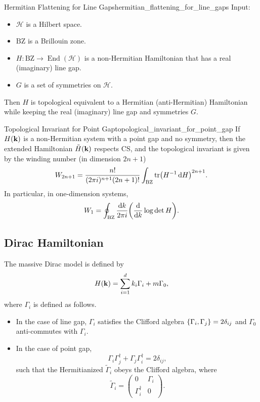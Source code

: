 \documentclass{article}
\begin{document}
\begin{theorem}{Hermitian Flattening for Line Gaps}{hermitian_flattening_for_line_gaps}
    Input:
    \begin{itemize}
        \item $\mathcal{H}$ is a Hilbert space.
        \item $\mathrm{BZ}$ is a Brillouin zone.
        \item $H: \mathrm{BZ} \rightarrow \operatorname{End}(\mathcal{H})$ is a non-Hermitian Hamiltonian that has a real (imaginary) line gap.
        \item $G$ is a set of symmetries on $\mathcal{H}$.
    \end{itemize}
    Then $H$ is topological equivalent to a Hermitian (anti-Hermitian) Hamiltonian while keeping the real (imaginary) line gap and symmetries $G$.
\end{theorem}

\begin{example}{Topological Invariant for Point Gap}{topological_invariant_for_point_gap}
    If $H(\vb{k})$ is a non-Hermitian system with a point gap and no symmetry, then the extended Hamiltonian $\tilde{H}(\vb{k})$ respects CS, and the topological invariant is given by the winding number (in dimension $2n+1$)
    \[ W_{2n+1} = \frac{n!}{(2\pi i)^{n+1}(2n+1)!} \int_{\mathrm{BZ}} \tr(H^{-1} \dd{H})^{2n+1}. \]
    In particular, in one-dimension systems,
    \[ W_1 = \oint_{\mathrm{BZ}} \frac{\dd{k}}{2\pi i} \qty(\dv{k} \log \det H). \]
\end{example}

\subsection{Dirac Hamiltonian}

The massive Dirac model is defined by
\[ H(\vb{k}) = \sum_{i=1}^d k_i \Gamma_i + m\Gamma_0, \]
where $\Gamma_i$ is defined as follows.
\begin{itemize}
    \item In the case of line gap, $\Gamma_i$ satisfies the Clifford algebra $\qty{\Gamma_i,\Gamma_j} = 2\delta_{ij}$ and $\Gamma_0$ anti-commutes with $\Gamma_i$.
    \item In the case of point gap,
    \[ \Gamma_i \Gamma_j^\dagger + \Gamma_j \Gamma_i^\dagger = 2\delta_{ij}, \]
    such that the Hermitianized $\tilde{\Gamma}_i$ obeys the Clifford algebra, where
    \[ \tilde{\Gamma}_i = \begin{pmatrix}
        0 & \Gamma_i \\
        \Gamma_i^\dagger & 0
    \end{pmatrix}. \]
\end{itemize}
\end{document}
